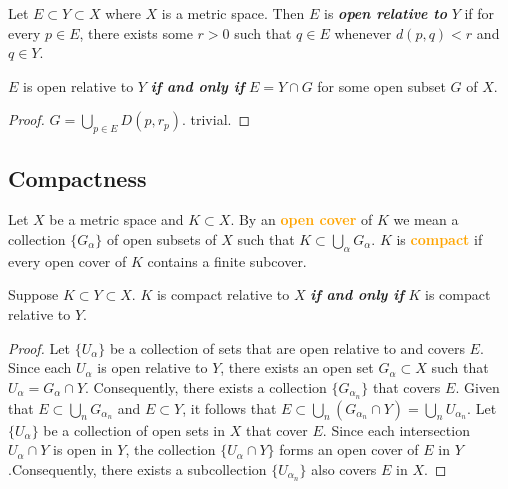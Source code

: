 \begin{definition}[pma 2.29]
Let $E\subset Y\subset X$ where $X$ is a metric space. Then $E$ is \textbf{\emph{open relative to}} $Y$ if for every $p\in E$, there exists some $r>0$ such that $q\in E$ whenever $d(p,q)<r$ and $q\in Y$.
\end{definition}

\begin{theorem}[pma 2.30]
$E$ is open relative to $Y$ \textbf{\emph{if and only if}} $E=Y\cap G$ for some open subset $G$ of $X$.
\end{theorem}
\begin{proof}
\forward $G = \bigcup_{p\in E}D(p,r_p)$.
\backward trivial.
\end{proof}

\subsection{Compactness}

\begin{definition}[pma 2.31, 2.32]
Let $X$ be a metric space and $K\subset X$. By an \textbf{\textcolor{orange}{open cover}} of $K$ we mean a collection $\{G_\alpha\}$ of open subsets of $X$ such that $K\subset \bigcup\limits_\alpha G_\alpha$. $K$ is \textbf{\textcolor{orange}{compact}} if every open cover of $K$ contains a finite subcover.
\end{definition}

\begin{theorem}[pma 2.33]
Suppose $K\subset Y\subset X$. $K$ is compact relative to $X$ \textbf{\emph{if and only if}} $K$ is compact relative to $Y$.
\end{theorem}
\begin{proof}
\forward Let $\{U_\alpha\}$ be a collection of sets that are open relative to and covers $E$. Since each $U_\alpha$ is open relative to $Y$, there exists an open set $G_\alpha \subset X$ such that $U_\alpha=G_\alpha \cap Y$. Consequently, there exists a collection $\{G_{\alpha_n}\}$ that covers $E$. Given that $E\subset \bigcup_n G_{\alpha_n}$ and $E\subset Y$, it follows that $E\subset \bigcup_n (G_{\alpha_n}\cap Y)=\bigcup_n U_{\alpha_n}$.
\backward Let $\{U_\alpha\}$ be a collection of open sets in $X$ that cover $E$. Since each intersection $U_\alpha \cap Y$ is open in $Y$, the collection $\{U_\alpha \cap Y\}$ forms an open cover of $E$ in $Y$.Consequently, there exists a subcollection $\{U_{\alpha_n}\}$ also covers $E$ in $X$.
\end{proof}

